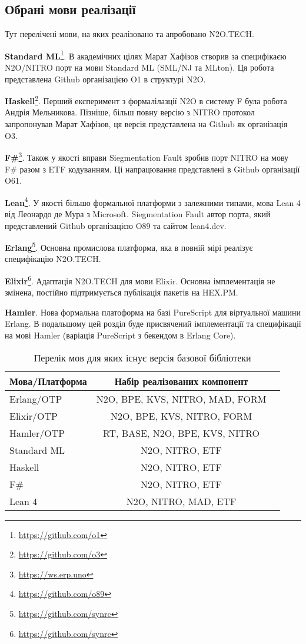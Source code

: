 \subsection*{Обрані мови реалізації}

Тут перелічені мови, на яких реалізовано та апробовано N2O.TECH.

\textbf{Standard ML}\footnote{\url{https://github.com/o1}}. В академічних цілях Марат Хафізов створив
за специфікаєю N2O/NITRO порт на мови Standard ML (SML/NJ та MLton).
Ця робота представлена Github організацією O1 в структурі N2O.

\textbf{Haskell}\footnote{\url{https://github.com/o3}}. Перший експеримент з формалілазції N2O в систему F
була робота Андрія Мельникова. Пізніше, більш повну версію з NITRO протокол
запропонував Марат Хафізов, ця версія представлена на Github як організація O3.

\textbf{F\#}\footnote{\url{https://ws.erp.uno}}. Також у якості вправи Siegmentation Fault зробив порт NITRO
на мову F\# разом з ETF кодуванням. Ці напрацювання представлені в Github
організації O61.

\textbf{Lean}\footnote{\url{https://github.com/o89}}. У якості більшо формальної платформи з залежними типами,
мова Lean 4 від Леонардо де Мура з Microsoft. Siegmentation Fault автор порта,
який представлений Github організацією O89 та сайтом lean4.dev.

\textbf{Erlang}\footnote{\url{https://github.com/synrc}}. Основна промислова платформа, яка в повній мірі реалізує
специфікацію N2O.TECH.

\textbf{Elixir}\footnote{\url{https://github.com/synrc}}. Адаптація N2O.TECH для мови Elixir.
Основна імплементація не змінена, постійно підтримується публікація пакетів на HEX.PM.

\textbf{Hamler}. Нова формальна платоформа на базі PureScript для віртуальної машини Erlang.
В подальшому цей розділ буде присвячений імплементації та специфікації
на мові Hamler (варіація PureScript з бекендом в Erlang Core).

\begin{table}[h]
\begin{center}
\caption{Перелік мов для яких існує версія базової бібліотеки}
\begin{tabular}{lcc}
\hline
\textbf{Мова/Платформа} & \textbf{Набір реалізованих компонент} \\
\hline
Erlang/OTP & N2O, BPE, KVS, NITRO, MAD, FORM \\
Elixir/OTP & N2O, BPE, KVS, NITRO, FORM \\
\hline
\rowcolor{LightGray}
Hamler/OTP & RT, BASE, N2O, BPE, KVS, NITRO \\
\hline
Standard ML & N2O, NITRO, ETF \\
Haskell & N2O, NITRO, ETF \\
F\# & N2O, NITRO, ETF \\
Lean 4 & N2O, NITRO, MAD, ETF \\
\hline
\end{tabular}
\end{center}
\end{table}

